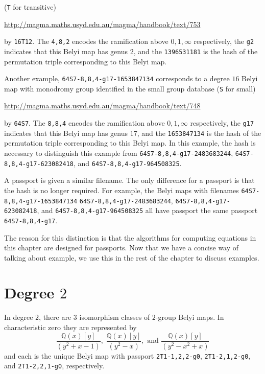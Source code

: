 \documentclass{dcthesis}
\newcommand{\QQ}{\mathbb Q}
\numberwithin{equation}{section}
\theoremstyle{definition}
\theoremstyle{remark}
\begin{document}
{{{    (\texttt{T} for transitive)
    \begin{center}
      \url{http://magma.maths.usyd.edu.au/magma/handbook/text/753}
    \end{center}
    by \texttt{16T12}.
    The \texttt{4,8,2} encodes the ramification
    above $0,1,\infty$ respectively,
    the \texttt{g2} indicates that this
    Belyi map has genus $2$,
    and the \texttt{1396531181}
    is the hash of the permutation triple
    corresponding to this Belyi map.
    \par
    Another example,
    \texttt{64S7-8,8,4-g17-1653847134}
    corresponds to a degree $16$
    Belyi map with monodromy group
    identified in the
    small group database
    (\texttt{S} for small)
    \begin{center}
      \url{http://magma.maths.usyd.edu.au/magma/handbook/text/748}
    \end{center}
    by \texttt{64S7}.
    The \texttt{8,8,4} encodes the ramification
    above $0,1,\infty$ respectively,
    the \texttt{g17} indicates that this
    Belyi map has genus $17$,
    and the \texttt{1653847134}
    is the hash of the permutation triple
    corresponding to this Belyi map.
    In this example,
    the hash is necessary to distinguish
    this example from
    \texttt{64S7-8,8,4-g17-2483683244},
    \texttt{64S7-8,8,4-g17-623082418},
    and
    \texttt{64S7-8,8,4-g17-964508325}.
    \par
    A passport is given a similar filename.
    The only difference for a passport is that
    the hash is no longer required.
    For example,
    the Belyi maps with filenames
    \texttt{64S7-8,8,4-g17-1653847134}
    \texttt{64S7-8,8,4-g17-2483683244},
    \texttt{64S7-8,8,4-g17-623082418},
    and
    \texttt{64S7-8,8,4-g17-964508325}
    all have passport the same passport
    \texttt{64S7-8,8,4-g17}.
    \par
    The reason for this
    distinction is that the algorithms
    for computing equations in this chapter
    are designed for passports.
    Now that we have a concise way of
    talking about example,
    we use this in the rest of the chapter
    to discuss examples.
  }
  \section{Degree $2$}{
    \label{sec:d2}
    In degree $2$,
    there are $3$
    isomorphism classes of
    $2$-group Belyi maps.
    In characteristic zero they are
    represented by
    \begin{equation}
      \label{eqn:d2}
      \frac{\QQ(x)[y]}{(y^2 + x - 1)},\;
      \frac{\QQ(x)[y]}{(y^2 - x)},
      \text{ and }
      \frac{\QQ(x)[y]}{(y^2 - x^2 + x)}
    \end{equation}
    and each is the unique
    Belyi map with passport
    \texttt{2T1-1,2,2-g0},
    \texttt{2T1-2,1,2-g0},
    and
    \texttt{2T1-2,2,1-g0},
    respectively.
  }
}}
\end{document}

